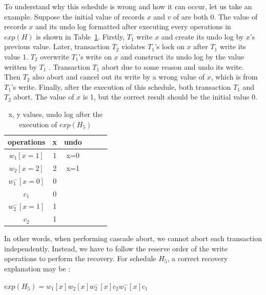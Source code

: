 \documentclass[conference]{IEEEtran}
\begin{document}
To understand why this schedule is wrong and how it can occur, let us take an example.  
Suppose the initial value of records ${x}$ and ${v}$ of are both 0.
The value of records ${x}$  and its undo log formatted after executing every operations in $exp(H)$ is shown in Table~\ref{tbl:x_y_vlues}.
Firstly, ${T_1}$ write ${x}$ and create its undo log by ${x}$'s previous value.
Later, transaction ${T_2}$ violates ${T_1}$'s lock on ${x}$ after ${T_1}$ write its value 1.
 ${T_2}$ overwrite ${T_1}$'s write on ${x}$ and construct its undo log by the value written by ${T_1}$ .
Transaction ${T_1}$ abort due to some reason and undo its write.
Then ${T_2}$ also abort and cancel out its write by a wrong value of ${x}$, which is from ${T_1}$'s write.
Finally, after the execution of this schedule, both transaction ${T_1}$ and ${T_2}$ abort.
The value of ${x}$ is 1, but the correct result should be the initial value 0.


\begin{table}[htb]
  \centering
  \begin{tabular}{|c|c|c|c|c|c|}
  \hline
operations & x & undo   \\
  \hline
  \hline
  $w_1[x=1]$ & 1 & x=0  \\
  \hline
  $w_2[x=2]$ & 2  & x=1   \\
  \hline
  $w^-_1[x=0]$ & 0  &   \\
  \hline

  $c_1$ & 0  &   \\
  \hline
  $w^-_2[x=1]$ & 1  &    \\
  \hline
  $c_2$ & 1  &  \\
  \hline
  \end{tabular}
\caption{x, y values, undo log after the execution of ${exp(H_5)}$}
\label{tbl:x_y_vlues}
\end{table}

In other words, when performing cascade abort, we cannot abort each transaction independently.
Instead, we have to follow the reserve order of the write operations to perform the recovery.
For schedule ${H_5}$, a correct recovery explanation may be :

\begin{center}
  ${exp(H_5) =  w_1[x]w_2[x]w^-_2[x]c_2w^-_1[x]c_1}$
\end{center}
\end{document}
